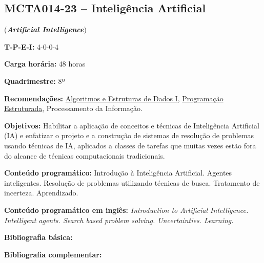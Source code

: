 \documentclass[class=article, crop=false]{standalone}
\begin{document}
\subsection{MCTA014-23 -- Inteligência Artificial}
\label{disc:ia}

(\textbf{\textit{Artificial Intelligence}})

\begin{center}
    \begin{minipage}{0.85\textwidth}
        \textbf{T-P-E-I:} 4-0-0-4
        
        \textbf{Carga horária:} 48 horas
        
        \textbf{Quadrimestre:} 8º
        
        \textbf{Recomendações:} 
        \hyperref[disc:aedI]{Algoritmos e Estruturas de Dados I},
        \hyperref[disc:pe]{Programação Estruturada},
        Processamento da Informação.
    \end{minipage}
\end{center}

\textbf{Objetivos:}
Habilitar a aplicação de conceitos e técnicas de Inteligência Artificial (IA) e
enfatizar o projeto e a construção de sistemas de resolução de problemas usando
técnicas de IA, aplicados a classes de tarefas que muitas vezes estão fora do
alcance de técnicas computacionais tradicionais.

\textbf{Conteúdo programático:}
Introdução à Inteligência Artificial.
Agentes inteligentes.
Resolução de problemas utilizando técnicas de busca.
Tratamento de incerteza.
Aprendizado.

\textbf{Conteúdo programático em inglês:}
\textit{Introduction to Artificial Intelligence.
Intelligent agents.
Search based problem solving.
Uncertainties.
Learning.}

\newrefsection
\textbf{Bibliografia básica:}
\nocite{2003-russel-etal,2003-rezende,1998-sutton-etal}
\printbibliography

\newrefsection
\textbf{Bibliografia complementar:}
\nocite{2006-bittencourt,2004-branchman,2001-mortari,2018-sutton-etal,2009-wooldridge}
\printbibliography
\end{document}
